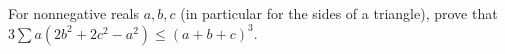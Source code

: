 For nonnegative reals $a,b,c$ (in particular for the sides of a triangle), prove that $3\sum a(2b^2+2c^2-a^2)\le(a+b+c)^3$.
